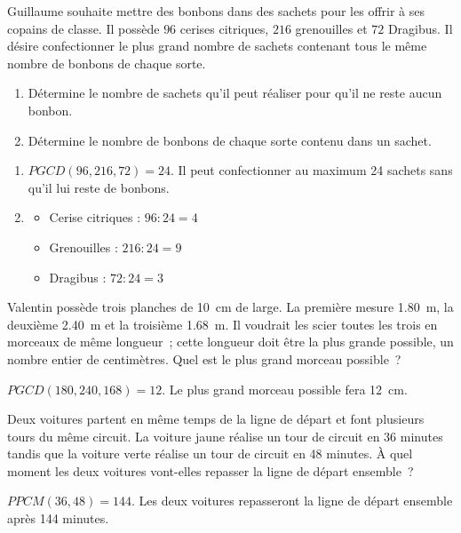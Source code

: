 \documentclass[../../syllabus_2.tex]{subfiles}
\begin{document}
\begin{exercise}
    Guillaume souhaite mettre des bonbons dans des sachets pour les offrir à ses copains de classe. Il possède $96$ cerises citriques, $216$ grenouilles et $72$ Dragibus. Il désire confectionner le plus grand nombre de sachets contenant tous le même nombre de bonbons de chaque sorte.
    \begin{enumerate}
        \item Détermine le nombre de sachets qu'il peut réaliser pour qu'il ne reste aucun bonbon.
        \item Détermine le nombre de bonbons de chaque sorte contenu dans un sachet.
    \end{enumerate}
\end{exercise}
\begin{solution}
    \begin{enumerate}
        \item \(PGCD(96, 216, 72) = 24\).
              Il peut confectionner au maximum 24 sachets sans qu'il lui reste de bonbons.
        \item 
        \begin{itemize}
            \item Cerise citriques : \(96 : 24 = 4\)
            \item Grenouilles : \(216 : 24 = 9\)
            \item Dragibus : \(72 : 24 = 3\)
        \end{itemize}
    \end{enumerate}
\end{solution}


\begin{exercise}
    Valentin possède trois planches de \SI{10}{cm} de large. La première mesure \SI{1,80}{m}, la deuxième \SI{2,40}{m} et la troisième \SI{1,68}{m}. Il voudrait les scier toutes les trois en morceaux de même longueur~; cette longueur doit être la plus grande possible, un nombre entier de centimètres. Quel est le plus grand morceau possible~?
\end{exercise}
\begin{solution}
    \(PGCD(180, 240, 168) = 12\).
    Le plus grand morceau possible fera \SI{12}{cm}.
\end{solution}

\begin{exercise}
    Deux voitures partent en même temps de la ligne de départ et font plusieurs tours du même circuit. La voiture jaune réalise un tour de circuit en 36 minutes tandis que la voiture verte réalise un tour de circuit en 48 minutes. À quel moment les deux voitures vont-elles repasser la ligne de départ ensemble~?
\end{exercise}
\begin{solution}
    \(PPCM(36,48) = 144\). Les deux voitures repasseront la ligne de départ ensemble après 144 minutes.
\end{solution}
\end{document}
